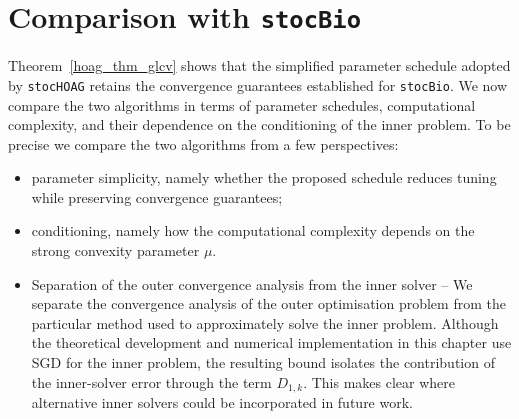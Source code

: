 \documentclass[11pt, twoside]{report}
\begin{document}
\section{Comparison with \texttt{stocBio}}
Theorem~\ref{hoag_thm_glcv} shows that the simplified parameter schedule adopted by \texttt{stocHOAG} retains the convergence guarantees established for \texttt{stocBio}. We now compare the two algorithms in terms of parameter schedules, computational complexity, and their dependence on the conditioning of the inner problem. To be precise we compare the two algorithms from a few perspectives:
\begin{itemize}
    \item parameter simplicity, namely whether the proposed schedule reduces tuning while preserving convergence guarantees;
    \item conditioning, namely how the computational complexity depends on the strong convexity parameter $\mu$.
    
    \item Separation of the outer convergence analysis from the inner solver – We separate the convergence analysis of the outer optimisation problem from the particular method used to approximately solve the inner problem. Although the theoretical development and numerical implementation in this chapter use SGD for the inner problem, the resulting bound isolates the contribution of the inner-solver error through the term $D_{1,k}$. This makes clear where alternative inner solvers could be incorporated in future work.
\end{itemize}
\end{document}
